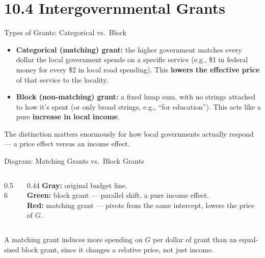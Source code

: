 \documentclass[11pt,aspectratio=169]{beamer}
\begin{document}
\section{10.4 Intergovernmental Grants}

\begin{frame}{Types of Grants: Categorical vs.\ Block}
  \begin{itemize}
    \item \textbf{Categorical (matching) grant:} the higher government matches every dollar the local government spends on a specific service (e.g., \$1 in federal money for every \$2 in local road spending). This \textbf{lowers the effective price} of that service to the locality.
    \item \textbf{Block (non-matching) grant:} a fixed lump sum, with no strings attached to how it's spent (or only broad strings, e.g., ``for education''). This acts like a pure \textbf{increase in local income}.
  \end{itemize}
  \small The distinction matters enormously for how local governments actually respond --- a price effect versus an income effect.
\end{frame}

\begin{frame}{Diagram: Matching Grants vs.\ Block Grants}
  \begin{columns}[T]
    \begin{column}{0.56\textwidth}
    \end{column}
    \begin{column}{0.44\textwidth}
      \scriptsize
      \textcolor{wugray}{\textbf{Gray:}} original budget line.\\[0.3em]
      \textcolor{wugreen}{\textbf{Green:}} block grant --- parallel shift, a pure income effect.\\[0.3em]
      \textcolor{wured}{\textbf{Red:}} matching grant --- pivots from the same intercept, lowers the price of $G$.
    \end{column}
  \end{columns}
  \vspace{0.3em}
  \scriptsize A matching grant induces more spending on $G$ per dollar of grant than an equal-sized block grant, since it changes a relative price, not just income.
\end{frame}
\end{document}
